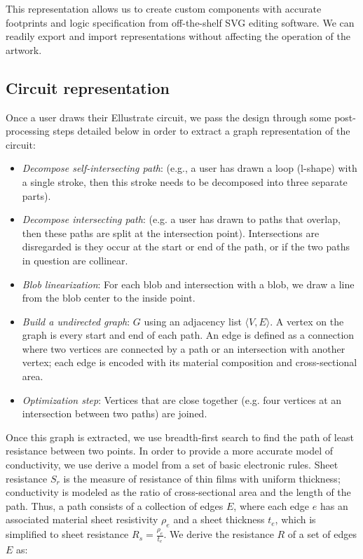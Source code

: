 \documentclass{sigchi}
\begin{document}
    This representation allows us to create custom components with accurate footprints and logic specification from off-the-shelf SVG editing software. We can readily export and import representations without affecting the operation of the artwork. 
 
    \subsection{Circuit representation}
    
    Once a user draws their Ellustrate circuit, we pass the design through some post-processing steps detailed below in order to extract a graph representation of the circuit: 
    \begin{itemize}
        \item \textit{Decompose self-intersecting path}:  (e.g., a user has drawn a loop (l-shape) with a single stroke, then this stroke needs to be decomposed into three separate parts). 
        \item \textit{Decompose intersecting path}:  (e.g. a user has drawn to paths that overlap, then these paths are split at the intersection point). Intersections are disregarded is they occur at the start or end of the path, or if the two paths in question are collinear. 
        \item \textit{Blob linearization}: For each blob and intersection with a blob, we draw a line from the blob center to the inside point.
        \item \textit{Build a undirected graph}: $G$ using an adjacency list $\langle V, E \rangle$. A vertex on the graph is every start and end of each path. An edge is defined as a connection where two vertices are connected by a path or an intersection with another vertex; each edge is encoded with its material composition and cross-sectional area. 
        \item \textit{Optimization step}: Vertices that are close together (e.g. four vertices at an intersection between two paths) are joined. 
    \end{itemize}
    Once this graph is extracted, we use breadth-first search to find the path of least resistance  between two points. In order to provide a more accurate model of conductivity, we use derive a model from a set of basic electronic rules. Sheet resistance $S_r$ is the measure of resistance of thin films with uniform thickness; conductivity is modeled as the ratio of cross-sectional area and the length of the path. Thus, a path consists of a collection of edges $E$, where each edge $e$ has an associated material sheet resistivity $\rho_e$ and a sheet thickness $t_e$, which is simplified to sheet resistance $R_s = \frac{\rho_e}{t_e}$. We derive the resistance $R$ of a set of edges $E$ as: 
\end{document}
